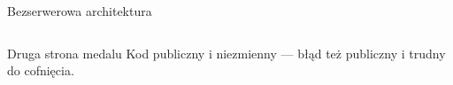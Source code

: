 \begin{frame}{Bezserwerowa architektura}
\begin{columns}[T]
\begin{center}
      \end{center}
  \end{columns}
  \vspace{0.1cm}
  \begin{alertblock}{Druga strona medalu}
    Kod publiczny i niezmienny --- błąd też publiczny i trudny do cofnięcia.
  \end{alertblock}
\end{frame}

